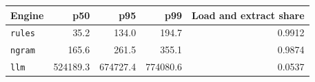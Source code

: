 \begingroup\small\setlength{\tabcolsep}{4pt}
\begin{tabular}{lrrrr}
\toprule
\textbf{Engine} & \textbf{p50} & \textbf{p95} & \textbf{p99} & \textbf{Load and extract share} \\  %
\midrule
\texttt{rules} & 35.2 & 134.0 & 194.7 & 0.9912 \\  %
\texttt{ngram} & 165.6 & 261.5 & 355.1 & 0.9874 \\  %
\texttt{llm} & 524189.3 & 674727.4 & 774080.6 & 0.0537 \\  %
\bottomrule
\end{tabular}
\endgroup
\par\smallskip{}
